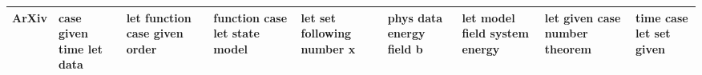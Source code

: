 \documentclass[11pt,a4paper]{article}
\begin{document}
\begin{appendices}
\begin{table*}[htp]
\begin{tiny}
\begin{tabular}{|p{}|p{}|p{}|p{}|p{}|p{}|p{}|p{}|p{}|}
ArXiv & case \newline given \newline time \newline let \newline data & let \newline function \newline case \newline given \newline order & function \newline case \newline let \newline state \newline model & let \newline set \newline following \newline number \newline x & phys \newline data \newline energy \newline field \newline b & let \newline model \newline field \newline system \newline energy & let \newline given \newline case \newline number \newline theorem & time \newline case \newline let \newline set \newline given\\\hline

\end{tabular}
\end{tiny}
\end{table*}
\end{appendices}
\end{document}
